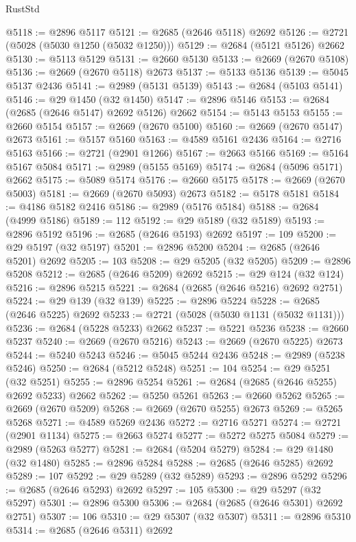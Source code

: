 \begin{lexlean}{RustStd}
\begin{coremodule}
@5118 := @2896 @5117
@5121 := @2685 (@2646 @5118) @2692
@5126 := @2721 (@5028 (@5030 @1250 (@5032 @1250)))
@5129 := @2684 (@5121 @5126) @2662
@5130 := @5113 @5129
@5131 := @2660 @5130
@5133 := @2669 (@2670 @5108)
@5136 := @2669 (@2670 @5118) @2673
@5137 := @5133 @5136
@5139 := @5045 @5137 @2436
@5141 := @2989 (@5131 @5139)
@5143 := @2684 (@5103 @5141)
@5146 := @29 @1450 (@32 @1450)
@5147 := @2896 @5146
@5153 := @2684 (@2685 (@2646 @5147) @2692 @5126) @2662
@5154 := @5143 @5153
@5155 := @2660 @5154
@5157 := @2669 (@2670 @5100)
@5160 := @2669 (@2670 @5147) @2673
@5161 := @5157 @5160
@5163 := @4589 @5161 @2436
@5164 := @2716 @5163
@5166 := @2721 (@2901 @1266)
@5167 := @2663 @5166
@5169 := @5164 @5167 @5084
@5171 := @2989 (@5155 @5169)
@5174 := @2684 (@5096 @5171) @2662
@5175 := @5089 @5174
@5176 := @2660 @5175
@5178 := @2669 (@2670 @5003)
@5181 := @2669 (@2670 @5093) @2673
@5182 := @5178 @5181
@5184 := @4186 @5182 @2416
@5186 := @2989 (@5176 @5184)
@5188 := @2684 (@4999 @5186)
@5189 := 112
@5192 := @29 @5189 (@32 @5189)
@5193 := @2896 @5192
@5196 := @2685 (@2646 @5193) @2692
@5197 := 109
@5200 := @29 @5197 (@32 @5197)
@5201 := @2896 @5200
@5204 := @2685 (@2646 @5201) @2692
@5205 := 103
@5208 := @29 @5205 (@32 @5205)
@5209 := @2896 @5208
@5212 := @2685 (@2646 @5209) @2692
@5215 := @29 @124 (@32 @124)
@5216 := @2896 @5215
@5221 := @2684 (@2685 (@2646 @5216) @2692 @2751)
@5224 := @29 @139 (@32 @139)
@5225 := @2896 @5224
@5228 := @2685 (@2646 @5225) @2692
@5233 := @2721 (@5028 (@5030 @1131 (@5032 @1131)))
@5236 := @2684 (@5228 @5233) @2662
@5237 := @5221 @5236
@5238 := @2660 @5237
@5240 := @2669 (@2670 @5216)
@5243 := @2669 (@2670 @5225) @2673
@5244 := @5240 @5243
@5246 := @5045 @5244 @2436
@5248 := @2989 (@5238 @5246)
@5250 := @2684 (@5212 @5248)
@5251 := 104
@5254 := @29 @5251 (@32 @5251)
@5255 := @2896 @5254
@5261 := @2684 (@2685 (@2646 @5255) @2692 @5233) @2662
@5262 := @5250 @5261
@5263 := @2660 @5262
@5265 := @2669 (@2670 @5209)
@5268 := @2669 (@2670 @5255) @2673
@5269 := @5265 @5268
@5271 := @4589 @5269 @2436
@5272 := @2716 @5271
@5274 := @2721 (@2901 @1134)
@5275 := @2663 @5274
@5277 := @5272 @5275 @5084
@5279 := @2989 (@5263 @5277)
@5281 := @2684 (@5204 @5279)
@5284 := @29 @1480 (@32 @1480)
@5285 := @2896 @5284
@5288 := @2685 (@2646 @5285) @2692
@5289 := 107
@5292 := @29 @5289 (@32 @5289)
@5293 := @2896 @5292
@5296 := @2685 (@2646 @5293) @2692
@5297 := 105
@5300 := @29 @5297 (@32 @5297)
@5301 := @2896 @5300
@5306 := @2684 (@2685 (@2646 @5301) @2692 @2751)
@5307 := 106
@5310 := @29 @5307 (@32 @5307)
@5311 := @2896 @5310
@5314 := @2685 (@2646 @5311) @2692

\end{coremodule}
\end{lexlean}
